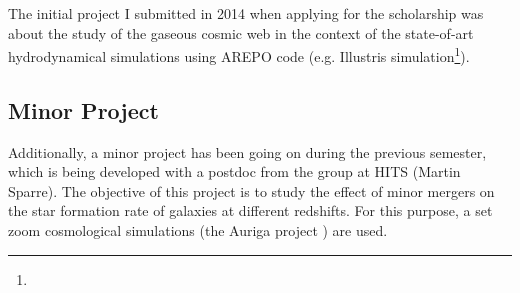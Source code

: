 \documentclass[a4,useAMS,usenatbib,usegraphicx,12pt]{article}
\begin{document}
The initial project I submitted in 2014 when applying for the scholarship was
about the study of the gaseous cosmic web in the context of the state-of-art 
hydrodynamical simulations using AREPO code (e.g. Illustris simulation\footnote{}).



\subsection{Minor Project}

Additionally, a minor project has been going on during the previous semester, 
which is being developed with a postdoc from the group at HITS (Martin Sparre).
The objective of this project is to study the effect of minor mergers on the
star formation rate of galaxies at different redshifts. For this purpose, a set
zoom cosmological simulations (the Auriga project \citep{Grand16}) are used.


\newpage

\renewcommand{\bibname}{8\ \ \ \ Bibliography}
\small

\end{document}
